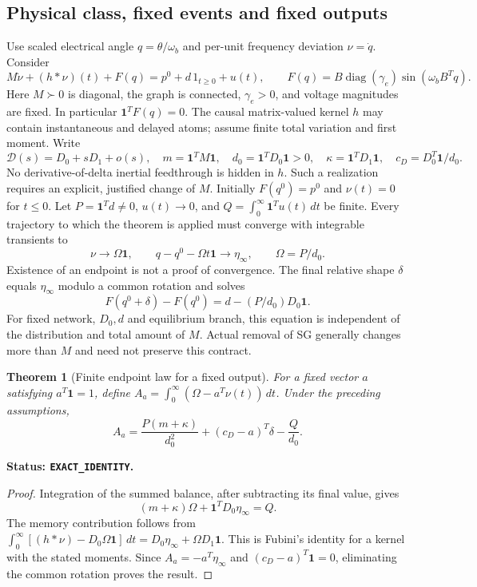 \documentclass[11pt]{article}
\newtheorem{theorem}{Theorem}
\newcommand{\diag}{\operatorname{diag}}
\newcommand{\one}{\mathbf{1}}
\newcommand{\status}[1]{\par\smallskip\noindent\textbf{Status: \texttt{#1}.}\ }
\begin{document}
\subsection{Physical class, fixed events and fixed outputs}
Use scaled electrical angle $q=\theta/\omega_b$ and per-unit frequency
deviation $\nu=\dot q$. Consider
\begin{equation}
 M\dot\nu+(h*\nu)(t)+F(q)=p^0+d\,1_{t\geq0}+u(t),\qquad
 F(q)=B\diag(\gamma_e)\sin(\omega_bB^Tq).
 \label{eq:nfl-model}
\end{equation}
Here $M\succ0$ is diagonal, the graph is connected, $\gamma_e>0$, and
voltage magnitudes are fixed. In particular $\one^TF(q)=0$.
The causal matrix-valued kernel $h$ may contain instantaneous and delayed
atoms; assume finite total variation and first moment. Write
\[
 \mathcal D(s)=D_0+sD_1+o(s),\quad
 m=\one^TM\one,\quad d_0=\one^TD_0\one>0,\quad
 \kappa=\one^TD_1\one,\quad c_D=D_0^T\one/d_0.
\]
No derivative-of-delta inertial feedthrough is hidden in $h$.
Such a realization requires an explicit, justified change of $M$.
Initially $F(q^0)=p^0$ and $\nu(t)=0$ for $t\leq0$.
Let $P=\one^Td\ne0$, $u(t)\to0$, and
$Q=\int_0^\infty\one^Tu(t)\,dt$ be finite.
Every trajectory to which the theorem is applied must converge with
integrable transients to
\[
 \nu\to\Omega\one,\qquad q-q^0-\Omega t\one\to\eta_\infty,
 \qquad \Omega=P/d_0.
\]
Existence of an endpoint is not a proof of convergence.
The final relative shape $\delta$ equals $\eta_\infty$ modulo a common
rotation and solves
\begin{equation}
 F(q^0+\delta)-F(q^0)=d-(P/d_0)D_0\one.
 \label{eq:nfl-endpoint}
\end{equation}
For fixed network, $D_0,d$ and equilibrium branch, this equation is
independent of the distribution and total amount of $M$.
Actual removal of SG generally changes more than $M$ and need not preserve
this contract.

\begin{theorem}[Finite endpoint law for a fixed output]
For a fixed vector $a$ satisfying $a^T\one=1$, define
$A_a=\int_0^\infty(\Omega-a^T\nu(t))\,dt$. Under the preceding assumptions,
\begin{equation}
 \boxed{A_a=\frac{P(m+\kappa)}{d_0^2}
              +(c_D-a)^T\delta-\frac{Q}{d_0}.}
 \label{eq:nfl-fixed-area}
\end{equation}
\end{theorem}
\status{EXACT\_IDENTITY}
\begin{proof}
Integration of the summed balance, after subtracting its final value, gives
\[
 (m+\kappa)\Omega+\one^TD_0\eta_\infty=Q.
\]
The memory contribution follows from
$\int_0^\infty[(h*\nu)-D_0\Omega\one]\,dt
=D_0\eta_\infty+\Omega D_1\one$.
This is Fubini's identity for a kernel with the stated moments.
Since $A_a=-a^T\eta_\infty$ and
$(c_D-a)^T\one=0$, eliminating the common rotation proves the result.
\end{proof}
\end{document}
